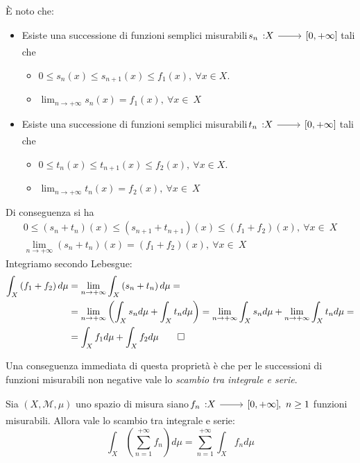 \begin{demonstration}
\begin{itemize}
	È noto che:
	\begin{itemize}
		\item Esiste una successione di funzioni semplici misurabili $\funz{s_n}{X}{\left[0,+\infty\right]}$ tali che
		\begin{itemize}
			\item $0\leq s_n\left(x\right)\leq s_{n+1}\left(x\right)\leq f_1\left(x\right),\ \forall x\in X$.
			\item $\displaystyle \lim_{n\to+\infty}s_n\left(x\right)=f_1\left(x\right),\ \forall x\in\ X$
		\end{itemize}
		\item Esiste una successione di funzioni semplici misurabili $\funz{t_n}{X}{\left[0,+\infty\right]}$ tali che
		\begin{itemize}
			\item $0\leq t_n\left(x\right)\leq t_{n+1}\left(x\right)\leq f_2\left(x\right),\ \forall x\in X$.
			\item $\displaystyle \lim_{n\to+\infty}t_n\left(x\right)=f_2\left(x\right),\ \forall x\in\ X$
		\end{itemize}
	\end{itemize}
	Di conseguenza si ha
	\begin{align*}
		0\leq \left(s_n+t_n\right)\left(x\right)\leq \left(s_{n+1}+t_{n+1}\right)\left(x\right)\leq\left(f_1+f_2\right)\left(x\right),\ \forall x\in\ X\\
		\lim_{n\to+\infty}\left(s_n+t_n\right)\left(x\right)=\left(f_1+f_2\right)\left(x\right),\ \forall x\in\ X
	\end{align*}
	Integriamo secondo Lebesgue:
	\begin{align*}
		\int_X \left(f_1+f_2\right)d\mu&=\lim_{n\to+\infty}\int_X\left(s_n+t_n\right)d\mu=\\
		&=\lim_{n\to+\infty}\left(\int_Xs_nd\mu+\int_Xt_nd\mu\right)=\lim_{n\to+\infty}\int_Xs_nd\mu+\lim_{n\to+\infty}\int_Xt_nd\mu=\\
		&=\int_Xf_1d\mu+\int_Xf_2d\mu\qedhere
	\end{align*}
		\end{itemize}
\end{demonstration}
Una conseguenza immediata di questa proprietà è che per le successioni di funzioni misurabili non negative vale lo \textit{scambio tra integrale e serie}.
\begin{corollary}
Sia $\left(X,\mathcal{M},\mu\right)$ uno spazio di misura siano $\funz{f_n}{X}{\left[0,+\infty\right]},\ n\geq 1$ funzioni misurabili. Allora vale lo scambio tra integrale e serie:
	\begin{equation}
		\int_X\left(\sum_{n=1}^{+\infty}f_n\right)d\mu=\sum_{n=1}^{+\infty}\int_Xf_nd\mu
	\end{equation}
\end{corollary}
